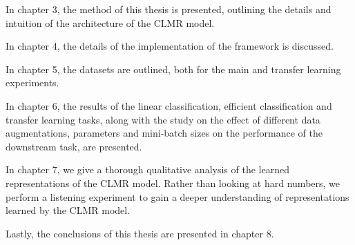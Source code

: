 In chapter 3, the method of this thesis is presented, outlining the details and intuition of the architecture of the CLMR model.

In chapter 4, the details of the implementation of the framework is discussed.

In chapter 5, the datasets are outlined, both for the main and transfer learning experiments.

In chapter 6, the results of the linear classification, efficient classification and transfer learning tasks, along with the study on the effect of different data augmentations, parameters and mini-batch sizes on the performance of the downstream task, are presented.

In chapter 7, we give a thorough qualitative analysis of the learned representations of the CLMR model. Rather than looking at hard numbers, we perform a listening experiment to gain a deeper understanding of representations learned by the CLMR model.

Lastly, the conclusions of this thesis are presented in chapter 8.

